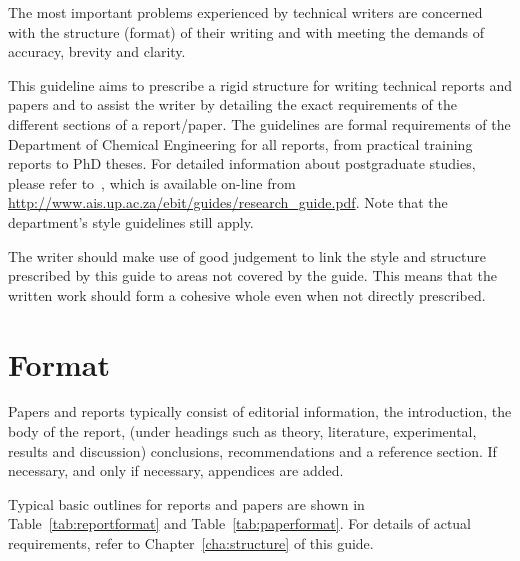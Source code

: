 \documentclass[a5paper, 10pt]{article}
\begin{document}
The most important problems experienced by technical writers are
concerned with the structure (format) of their writing and with
meeting the demands of accuracy, brevity and clarity.

This guideline aims to prescribe a rigid structure for writing
technical reports and papers and to assist the writer by detailing the
exact requirements of the different sections of a report/paper.  The
guidelines are formal requirements of the Department of Chemical
Engineering for all reports, from practical training reports to PhD
theses.  For detailed information about postgraduate studies,
please refer to~\citet{buys}, which is available on-line from
\url{http://www.ais.up.ac.za/ebit/guides/research_guide.pdf}.  Note
that the department's style guidelines still apply.

The writer should make use of good judgement to link the style and
structure prescribed by this guide to areas not covered by the guide.
This means that the written work should form a cohesive whole even
when not directly prescribed.

\section{Format}
\label{cha:format}
Papers and reports typically consist of editorial information, the
introduction, the body of the report, (under headings such as theory,
literature, experimental, results and discussion) conclusions,
recommendations and a reference section.  If necessary, and only if
necessary, appendices are added.

Typical basic outlines for reports and papers are shown in
Table~\ref{tab:reportformat} and Table~\ref{tab:paperformat}.
For details of actual requirements, refer to
Chapter~\ref{cha:structure} of this guide.  
\end{document}
